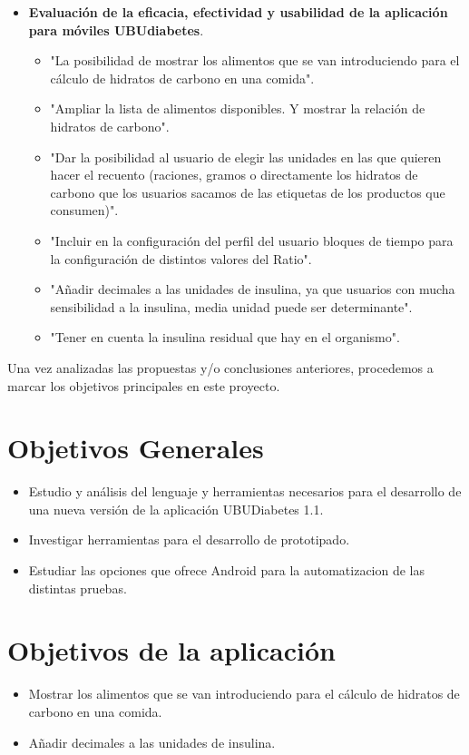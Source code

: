 \begin{itemize}
	\item \textbf{Evaluación de la eficacia, efectividad y usabilidad de la aplicación para móviles UBUdiabetes}\cite{bruno2017}.
	\begin{itemize}
		\item "La posibilidad de mostrar los alimentos que se van introduciendo para el cálculo de hidratos de carbono en una 		comida".
		\item "Ampliar la lista de alimentos disponibles. Y mostrar la relación de hidratos de carbono".
		\item "Dar la posibilidad al usuario de elegir las unidades en las que quieren hacer el recuento (raciones, gramos o 		directamente los hidratos de carbono que los usuarios sacamos de las etiquetas de los productos que consumen)".
		\item "Incluir en la configuración del perfil del usuario bloques de tiempo para la configuración de distintos valores 	del Ratio".
		\item "Añadir decimales a las unidades de insulina, ya que usuarios con mucha sensibilidad a la insulina, media unidad 	puede ser determinante".
		\item "Tener en cuenta la insulina residual que hay en el organismo".
	\end{itemize}
\end{itemize}
Una vez analizadas las propuestas y/o conclusiones anteriores, procedemos a marcar los objetivos principales en este proyecto.
\section{ Objetivos Generales}
	\begin{itemize}
		\item Estudio y análisis del lenguaje y herramientas necesarios para el desarrollo de una nueva versión de la aplicación UBUDiabetes 1.1.
		\item Investigar herramientas para el desarrollo de prototipado.
		\item Estudiar las opciones que ofrece Android para la automatizacion de las distintas pruebas.
		
	\end{itemize}

\section{ Objetivos de la aplicación}
	\begin{itemize}
		\item Mostrar los alimentos que se van introduciendo para el cálculo de hidratos de carbono en una comida.
		\item Añadir decimales a las unidades de insulina.
		
	\end{itemize}